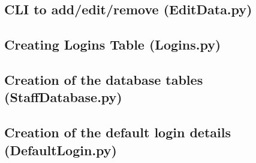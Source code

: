 \begin{landscape}
\begin{footnotesize}
\newpage
\subsection{CLI to add/edit/remove (EditData.py)}\label{EditData}

\newpage
\subsection{Creating Logins Table (Logins.py)}\label{MMM}


\newpage
\subsection{Creation of the database tables (StaffDatabase.py)}\label{SDB}

\newpage
\subsection{Creation of the default login details (DefaultLogin.py)}\label{DL}

\end{footnotesize}

\end{landscape}

